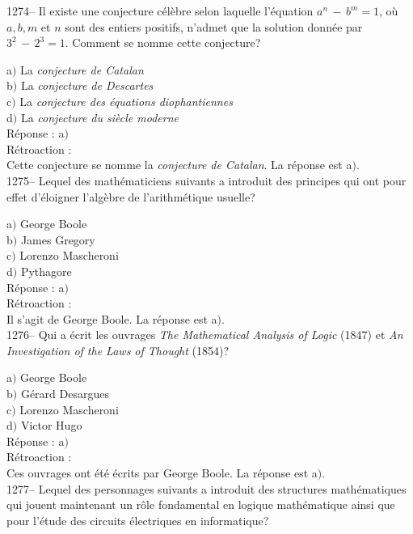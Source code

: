 ﻿\documentclass[letterpaper, 12pt]{article}
\begin{document}
1274-- Il existe une conjecture c\'el\`ebre selon laquelle
l'\'equation $a^n\,-\,b^m=1$, o\`u $a,b,m$ et $n$ sont des entiers
positifs, n'admet que la solution donn\'ee par $3^2\,-\,2^3=1$.
Comment se nomme cette conjecture?

a$)$ La {\sl conjecture de Catalan} \\
b$)$ La {\sl conjecture de Descartes} \\
c$)$ La {\sl conjecture des \'equations diophantiennes} \\
d$)$ La {\sl conjecture du si\`ecle moderne}\\

R\'eponse : a$)$\\

R\'etroaction : \\
Cette conjecture se nomme la {\sl conjecture de Catalan}.
La r\'eponse est a$)$.\\

1275-- Lequel des math\'ematiciens suivants a introduit des
principes qui ont pour effet d'\'eloigner l'alg\`ebre de
l'arithm\'etique usuelle?

a$)$ George Boole \\
b$)$ James Gregory \\
c$)$ Lorenzo Mascheroni \\
d$)$ Pythagore\\

R\'eponse : a$)$\\

R\'etroaction : \\
Il s'agit de George Boole.
La r\'eponse est a$)$.\\

1276-- Qui a \'ecrit les ouvrages {\sl The Mathematical Analysis of
Logic} (1847) et {\sl An Investigation of the Laws of Thought}
(1854)?

a$)$ George Boole \\
b$)$ G\'erard Desargues \\
c$)$ Lorenzo Mascheroni \\
d$)$ Victor Hugo\\

R\'eponse : a$)$\\

R\'etroaction : \\
Ces ouvrages ont \'et\'e \'ecrits par George Boole.
La r\'eponse est a$)$.\\

1277-- Lequel des personnages suivants a introduit des structures
math\'ematiques qui jouent maintenant un r\^ole fondamental en
logique math\'ematique ainsi que pour l'\'etude des circuits
\'electriques en informatique?
\end{document}
